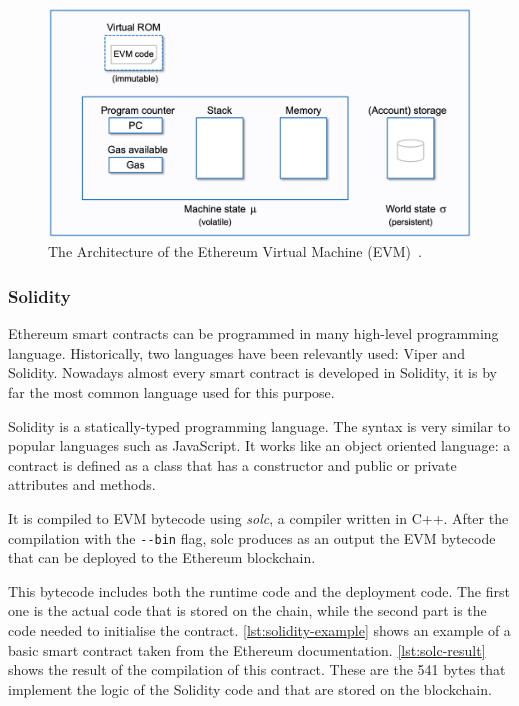 \begin{figure}[!ht]
    \centering
    \includegraphics[width=1\textwidth]{Figures/background/evm.png}
    \caption{The Architecture of the Ethereum Virtual Machine (EVM)~\cite{evm-illustrated}.}
    \label{fig:evm-architecture}
\end{figure}

\subsubsection{Solidity}

Ethereum smart contracts can be programmed in many high-level programming language. Historically, two languages have been relevantly used: Viper and Solidity. Nowadays almost every smart contract is developed in Solidity, it is by far the most common language used for this purpose.

Solidity is a statically-typed programming language. The syntax is very similar to popular languages such as JavaScript. It works like an object oriented language: a contract is defined as a class that has a constructor and public or private attributes and methods.

It is compiled to EVM bytecode using \textit{solc}, a compiler written in C++. After the compilation with the \lstinline{--bin} flag, solc produces as an output the EVM bytecode that can be deployed to the Ethereum blockchain.

This bytecode includes both the runtime code and the deployment code. The first one is the actual code that is stored on the chain, while the second part is the code needed to initialise the contract. \cref{lst:solidity-example} shows an example of a basic smart contract taken from the Ethereum documentation. \cref{lst:solc-result} shows the result of the compilation of this contract. These are the 541 bytes that implement the logic of the Solidity code and that are stored on the blockchain.

